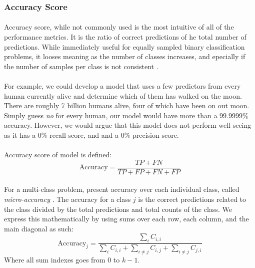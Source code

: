 \documentclass[12pt,letterpaper]{article}
\begin{document}

\subsubsection{Accuracy Score}

\paragraph*{}Accuracy score, while not commonly used is the most intuitive of all of the performance metrics. It is the ratio of correct predictions of he total number of predictions. While immediately useful for equally sampled binary classification problems, it looses meaning as the number of classes increases, and epecially if the number of samples per class is not consistent \cite{Geron}.

\paragraph*{}For example, we could develop a model that uses a few predictors from every human currently alive and determine which of them has walked on the moon. There are roughly 7 billion humans alive, four of which have been on out moon. Simply guess \textit{no} for every human, our model would have more than a $99.9999\%$ accuracy. However, we would argue that this model does not perform well seeing as it has a $0 \%$ recall score, and and a $0 \%$ precision score.

\paragraph*{}Accuracy score of model is defined:
\begin{equation}
\label{eqn-BinaryAccuracy}
\text{Accuracy} = \frac{TP + FN}{TP + FP + FN + FP}
\end{equation}

\paragraph*{}For a multi-class problem, present accuracy over each individual class, called \textit{micro-accuracy} \cite{James}. The accuracy for a class $j$ is the correct predictions related to the class divided by the total predictions and total counts of the class. We express this mathematically by using sums over each row, each column, and the main diagonal as such:
\begin{equation}
\label{eqn-Accuracy}
\text{Accuracy}_j = \frac{\sum_{i}C_{i,i}}{\sum_{i}C_{i,i} + \sum_{i \neq j}C_{i,j} + \sum_{i \neq j}C_{j,i}}
\end{equation}
Where all sum indexes goes from $0$ to $k-1$.
\end{document}
